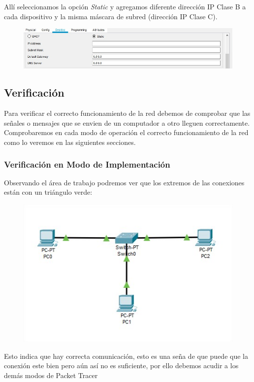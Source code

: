 \documentclass[journal]{IEEEtran}
\begin{document}
Allí seleccionamos la opción \textit{Static} y agregamos diferente dirección IP Clase B a cada dispositivo y la misma máscara de subred (dirección IP Clase C).

\begin{figure}[ht]
	\centering
	\includegraphics[scale=0.5]{pt_ip.jpg}
\end{figure}

\subsection{Verificación}
Para verificar el correcto funcionamiento de la red debemos de comprobar que las señales o mensajes que se envien de un computador a otro lleguen correctamente. \\
Comprobaremos en cada modo de operación el correcto funcionamiento de la red como lo veremos en las siguientes secciones.
	\subsubsection{Verificación en Modo de Implementación}
	Observando el área de trabajo podremos ver que los extremos de las conexiones están con un triángulo verde:
	\begin{figure}[ht]
		\centering
		\includegraphics[scale=0.5]{pt_ver_modoimplementacion.jpg}
	\end{figure}	
	Esto indica que hay correcta comunicación, esto es una seña de que puede que la conexión este bien pero aún así no es suficiente, por ello debemos acudir a los demás modos de Packet Tracer
\end{document}
